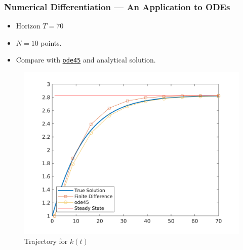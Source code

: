 \documentclass[11pt,xcolor={svgnames},aspectratio=169,usepdftitle=false]{beamer}
\begin{document}
\begin{frame}
  \frametitle{Numerical Differentiation --- An Application to ODEs}
  \begin{minipage}{0.3\textwidth}
  \begin{itemize}
    \item Horizon $T = 70$
    \item $N = 10$ points.
    \item Compare with \href{https://www.mathworks.com/help/matlab/ref/ode45.html}{\texttt{ode45}} and analytical solution.
  \end{itemize}
  \end{minipage}
\begin{minipage}{0.65\textwidth}
  \begin{figure}
    \centering
    \includegraphics[width = \textwidth]{../figures/solow_solution.png}
    \caption{Trajectory for $k(t)$}
    \label{fig:solow_finitedifferences}
  \end{figure}
\end{minipage}
\end{frame}
\end{document}
